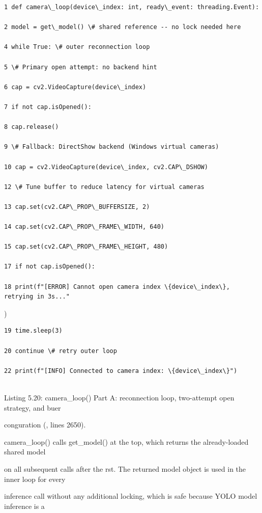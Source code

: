 \begin{listingbox}
	\begin{verbatim}
1 def camera\_loop(device\_index: int, ready\_event: threading.Event):

2 model = get\_model() \# shared reference -- no lock needed here

4 while True: \# outer reconnection loop

5 \# Primary open attempt: no backend hint

6 cap = cv2.VideoCapture(device\_index)

7 if not cap.isOpened():

8 cap.release()

9 \# Fallback: DirectShow backend (Windows virtual cameras)

10 cap = cv2.VideoCapture(device\_index, cv2.CAP\_DSHOW)

12 \# Tune buffer to reduce latency for virtual cameras

13 cap.set(cv2.CAP\_PROP\_BUFFERSIZE, 2)

14 cap.set(cv2.CAP\_PROP\_FRAME\_WIDTH, 640)

15 cap.set(cv2.CAP\_PROP\_FRAME\_HEIGHT, 480)

17 if not cap.isOpened():

18 print(f"[ERROR] Cannot open camera index \{device\_index\}, retrying in 3s..."

\end{verbatim}
\end{listingbox}
)

\begin{listingbox}
	\begin{verbatim}
19 time.sleep(3)

20 continue \# retry outer loop

22 print(f"[INFO] Connected to camera index: \{device\_index\}")


\end{verbatim}
\end{listingbox}
Listing 5.20: camera\_loop() Part A: reconnection loop, two-attempt open strategy, and buer

conguration (, lines 2650).

camera\_loop() calls get\_model() at the top, which returns the already-loaded shared model

on all subsequent calls after the rst. The returned model object is used in the inner loop for every

inference call without any additional locking, which is safe because YOLO model inference is a

